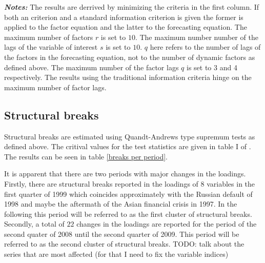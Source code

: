 \documentclass[12pt]{article}
\begin{document}
\begin{table}[ht]
	\begin{minipage}{15cm}
		\small{\textbf{\textit{Notes:}} The results are derrived by minimizing the criteria in the first column. If both an \citet{bai2002determining} criterion and a standard information criterion is given the former is applied to the factor equation and the latter to the forecasting equation. The maximum number of factors $r$ is set to $10$. The maximum number number of the lags of the variable of interest $s$ is set to $10$. $q$ here refers to the number of lags of the factors in the forecasting equation, not to the number of dynamic factors as defined above. The maximum number of the factor lags $q$ is set to 3 and 4 respectively. The results using the traditional information criteria hinge on the maximum number of factor lags.}
	\end{minipage}
\end{table}

\subsection{Structural breaks}
Structural breaks are estimated using Quandt-Andrews type supremum tests as defined above. The critival values for the test statistics are given in table I of \citet{andrews2003tests}. The results can be seen in table \ref{breaks per period}. 

It is apparent that there are two periods with major changes in the loadings. Firstly, there are structural breaks reported in the loadings of $8$ variables in the first quarter of 1999 which coincides approximately with the Russian default of 1998 and maybe the aftermath of the Asian financial crisis in 1997. In the following this period will be referred to as the first cluster of structural breaks. Secondly, a total of $22$ changes in the loadings are reported for the period of the second quater of 2008 until the second quarter of 2009. This period will be referred to as the second cluster of structural breaks.
TODO: talk about the series that are most affected (for that I need to fix the variable indices)
\\
\end{document}
